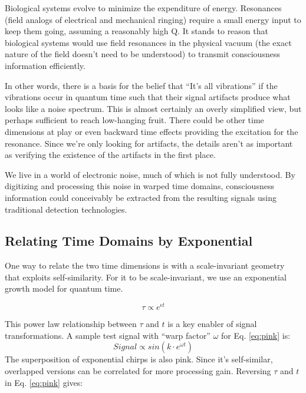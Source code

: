 Biological systems evolve to minimize the expenditure of energy. Resonances
(field analogs of electrical and mechanical ringing) require a small energy
input to keep them going, assuming a reasonably high Q. It stands to reason
that biological systems would use field resonances in the physical vacuum
(the exact nature of the field doesn't need to be understood)
to transmit consciousness information efficiently.

In other words, there is a basis for the belief that ``It's all vibrations''
if the vibrations occur in quantum time such that their signal artifacts
produce what looks like a noise spectrum.
This is almost certainly an overly simplified view,
but perhaps sufficient to reach low-hanging fruit.
There could be other time dimensions at play or
even backward time effects providing the excitation for the resonance.
Since we're only looking for artifacts, the details aren't as important
as verifying the existence of the artifacts in the first place.

We live in a world of electronic noise, much of which is not fully understood.
By digitizing and processing this noise in warped time domains,
consciousness information could conceivably be extracted from the
resulting signals using traditional detection technologies.

\subsection{Relating Time Domains by Exponential}

One way to relate the two time dimensions is with a scale-invariant geometry
that exploits self-similarity.
For it to be scale-invariant,
we use an exponential growth model for quantum time.

\begin{equation} \label{eq:pink}
\tau \propto e^{\epsilon t}
\end{equation}

This power law relationship between $\tau$ and $t$
is a key enabler of signal transformations.
A sample test signal with ``warp factor'' $\omega$ for Eq. \ref{eq:pink} is:
\begin{equation} \label{eq:wp}
Signal \propto sin(k \cdot e^{\omega t})
\end{equation}
The superposition of exponential chirps is also pink.
Since it's self-similar,
overlapped versions can be correlated for more processing gain.
Reversing $\tau$ and $t$ in Eq. \ref{eq:pink} gives:


